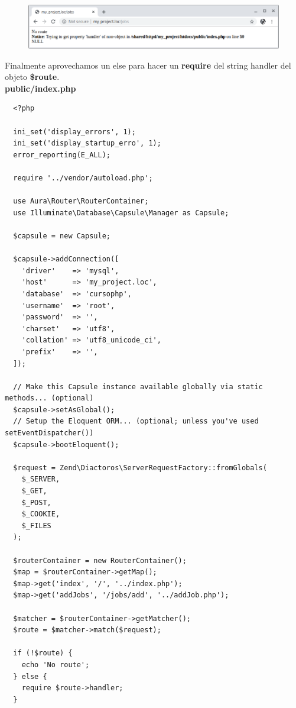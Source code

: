 \documentclass{article}
\begin{document}
\begin{figure}[h!]
  \centering
  \includegraphics[scale=0.5]{./Pictures/122_route.png}
\end{figure}

Finalmente aprovechamos un else para hacer un \textbf{require} del string
handler del objeto \textbf{\$route}.\\

\textbf{public/index.php}
\begin{verbatim}
  <?php

  ini_set('display_errors', 1);
  ini_set('display_startup_erro', 1);
  error_reporting(E_ALL);

  require '../vendor/autoload.php';

  use Aura\Router\RouterContainer;
  use Illuminate\Database\Capsule\Manager as Capsule;

  $capsule = new Capsule;

  $capsule->addConnection([
    'driver'    => 'mysql',
    'host'      => 'my_project.loc',
    'database'  => 'cursophp',
    'username'  => 'root',
    'password'  => '',
    'charset'   => 'utf8',
    'collation' => 'utf8_unicode_ci',
    'prefix'    => '',
  ]);

  // Make this Capsule instance available globally via static methods... (optional)
  $capsule->setAsGlobal();
  // Setup the Eloquent ORM... (optional; unless you've used setEventDispatcher())
  $capsule->bootEloquent();

  $request = Zend\Diactoros\ServerRequestFactory::fromGlobals(
    $_SERVER,
    $_GET,
    $_POST,
    $_COOKIE,
    $_FILES
  );

  $routerContainer = new RouterContainer();
  $map = $routerContainer->getMap();
  $map->get('index', '/', '../index.php');
  $map->get('addJobs', '/jobs/add', '../addJob.php');

  $matcher = $routerContainer->getMatcher();
  $route = $matcher->match($request);

  if (!$route) {
    echo 'No route';
  } else {
    require $route->handler;
  }
\end{verbatim}

\newpage
\end{document}
